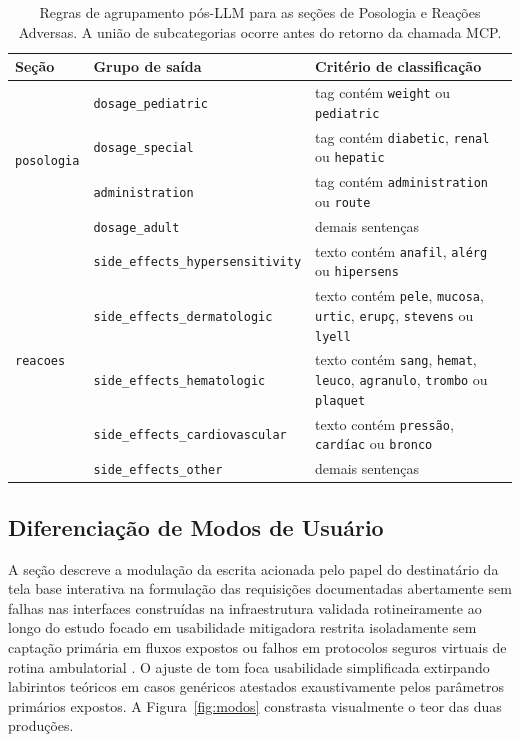 \documentclass[12pt]{article}
\begin{document}
\begin{table}[htbp]
\caption{Regras de agrupamento pós-LLM para as seções de Posologia e Reações Adversas. A união de subcategorias ocorre antes do retorno da chamada MCP.}
\label{tab:grouping}
\centering
\small
\begin{tabularx}{\textwidth}{@{}l l X@{}}
\toprule
\textbf{Seção} & \textbf{Grupo de saída} & \textbf{Critério de classificação} \\
\midrule
\multirow{4}{*}{\texttt{posologia}}
  & \texttt{dosage\_pediatric} & tag contém \texttt{weight} ou \texttt{pediatric} \\
  & \texttt{dosage\_special}   & tag contém \texttt{diabetic}, \texttt{renal} ou \texttt{hepatic} \\
  & \texttt{administration}    & tag contém \texttt{administration} ou \texttt{route} \\
  & \texttt{dosage\_adult}     & demais sentenças \\
\midrule
\multirow{5}{*}{\texttt{reacoes}}
  & \texttt{side\_effects\_hypersensitivity} & texto contém \texttt{anafil}, \texttt{alérg} ou \texttt{hipersens} \\
  & \texttt{side\_effects\_dermatologic}     & texto contém \texttt{pele}, \texttt{mucosa}, \texttt{urtic}, \texttt{erupç}, \texttt{stevens} ou \texttt{lyell} \\
  & \texttt{side\_effects\_hematologic}      & texto contém \texttt{sang}, \texttt{hemat}, \texttt{leuco}, \texttt{agranulo}, \texttt{trombo} ou \texttt{plaquet} \\
  & \texttt{side\_effects\_cardiovascular}   & texto contém \texttt{pressão}, \texttt{cardíac} ou \texttt{bronco} \\
  & \texttt{side\_effects\_other}            & demais sentenças \\
\bottomrule
\end{tabularx}
\end{table}
\FloatBarrier

\subsection{Diferenciação de Modos de Usuário}

A seção descreve a modulação da escrita acionada pelo papel do destinatário da tela base interativa na formulação das requisições documentadas abertamente sem falhas nas interfaces construídas na infraestrutura validada rotineiramente ao longo do estudo focado em usabilidade mitigadora restrita isoladamente sem captação primária em fluxos expostos ou falhos em protocolos seguros virtuais de rotina ambulatorial \cite{anvisa2023ranking}. O ajuste de tom foca usabilidade simplificada extirpando labirintos teóricos em casos genéricos atestados exaustivamente pelos parâmetros primários expostos. A Figura~\ref{fig:modos} constrasta visualmente o teor das duas produções.
\end{document}
